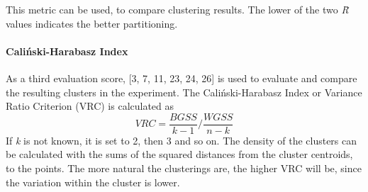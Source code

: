 This metric can be used, to compare clustering results. The lower of the two \textit{\=R} values indicates the better partitioning.

\paragraph{Caliński-Harabasz Index}
As a third evaluation score, \textcite{calinskiHarabasz}[3, 7, 11, 23, 24, 26] is used to evaluate and compare the resulting clusters in the experiment. 
The Caliński-Harabasz Index or Variance Ratio Criterion (VRC) is calculated as 
\[
VRC = \frac{BGSS}{k-1}/\frac{WGSS}{n-k}
\]
If \textit{k} is not known, it is set to 2, then 3 and so on. The density of the clusters can be calculated with the sums of the squared distances from the cluster centroids, to the points. The more natural the clusterings are, the higher VRC will be, since the variation within the cluster is lower.







  